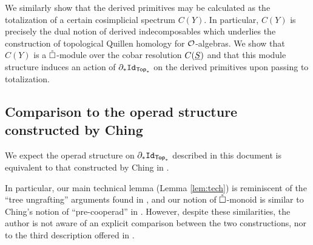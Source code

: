 We similarly show that the derived primitives may be calculated as the totalization of a certain cosimplicial spectrum $C(Y)$. In particular, $C(Y)$ is precisely the dual notion of derived indecomposables which underlies the construction of topological Quillen homology for $\mathcal{O}$-algebras. We show that $C(Y)$ is a $\mathring{\square}$-module over the cobar resolution $C(\underline{S})$ and that this module structure induces an action of $\partial_*\mathtt{Id}_{\mathsf{Top}_*}$ on the derived primitives upon passing to totalization. 


\subsection{Comparison to the operad structure constructed by Ching} We expect the operad structure on $\partial_* \mathtt{Id}_{\mathsf{Top}_*}$ described in this document is equivalent to that constructed by Ching in \cite{Ching-thesis}. 

In particular, our main technical lemma (Lemma \ref{lem:tech}) is reminiscent of the ``tree ungrafting'' arguments found in \cite{Ching-thesis}, and our notion of $\mathring{\square}$-monoid is similar to Ching's notion of ``pre-cooperad'' in \cite{Ching-barcobar}. However, despite these similarities, the author is not aware of an explicit comparison between the two constructions, nor to the third description offered in \cite{Ching-day-conv}.